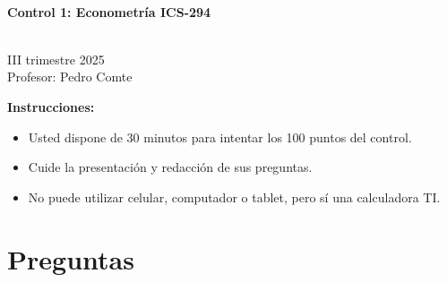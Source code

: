 \documentclass[10pt,a4paper]{article}
\begin{document}
\vspace{5cm}



\begin{center}
\begin{large}
\textbf{\\Control 1: Econometría ICS-294}
\end{large}\\
\vspace{0.2cm}
III trimestre 2025\\
Profesor: Pedro Comte\\
\end{center}

\textbf{Instrucciones:} 

\begin{itemize}

    \item Usted dispone de 30 minutos  para intentar los 100 puntos del control.
    \item Cuide la presentación y redacción de sus preguntas.
    \item No puede utilizar celular, computador o tablet, pero sí una calculadora TI.
     
\end{itemize}

\section{Preguntas}
\end{document}
